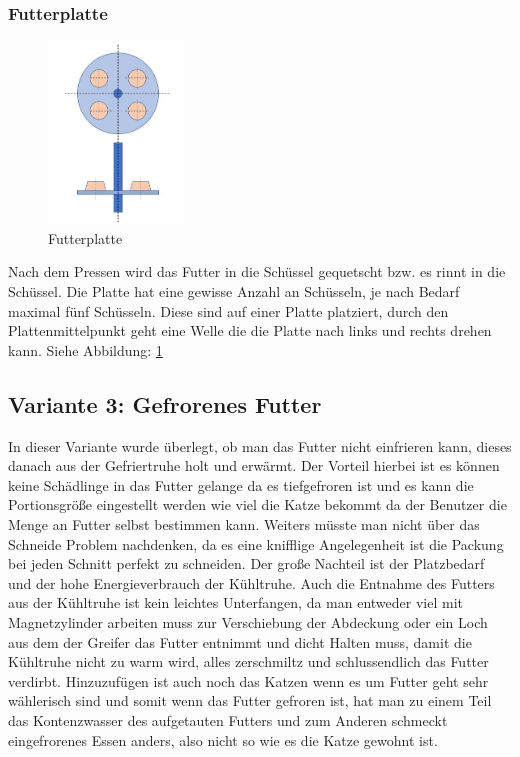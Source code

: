 \newpage
\subsubsection{Futterplatte}

\begin{figure}
\vspace{-30pt}
  \begin{center}
    \includegraphics[width=0.32\textwidth]{Bilder/Powerpoint/Futterplatte}
  \end{center}
  \caption{Futterplatte}
  \label{Futterplatte}
  \vspace{-20pt}
\end{figure}


Nach dem Pressen wird das Futter in die Schüssel gequetscht bzw. es rinnt in die Schüssel. Die Platte hat eine gewisse Anzahl an Schüsseln, je nach Bedarf maximal fünf Schüsseln. Diese sind auf einer Platte platziert, durch den Plattenmittelpunkt geht eine Welle die die Platte nach links und rechts drehen kann. Siehe Abbildung: \ref{Futterplatte}



\subsection{Variante 3: Gefrorenes Futter}

In dieser Variante wurde überlegt, ob man das Futter nicht einfrieren kann, dieses danach aus der Gefriertruhe holt und erwärmt. Der Vorteil hierbei ist es können keine Schädlinge in das Futter gelange da es tiefgefroren ist und es kann die Portionsgröße eingestellt werden wie viel die Katze bekommt da der Benutzer die Menge an Futter selbst bestimmen kann.  Weiters müsste man nicht über das Schneide Problem nachdenken, da es eine knifflige Angelegenheit ist die Packung bei jeden Schnitt perfekt zu schneiden. Der große Nachteil ist der Platzbedarf und der hohe Energieverbrauch der Kühltruhe. Auch die Entnahme des Futters aus der Kühltruhe ist kein leichtes Unterfangen, da man entweder viel mit Magnetzylinder arbeiten muss zur Verschiebung der Abdeckung oder ein Loch aus dem der Greifer das Futter entnimmt und dicht Halten muss, damit die Kühltruhe nicht zu warm wird, alles zerschmiltz und schlussendlich das Futter verdirbt. Hinzuzufügen ist auch noch das Katzen wenn es um Futter geht sehr wählerisch sind und somit wenn das Futter gefroren ist, hat man zu einem  Teil das Kontenzwasser des aufgetauten Futters und zum Anderen schmeckt eingefrorenes Essen anders, also nicht so wie es die Katze gewohnt ist.

